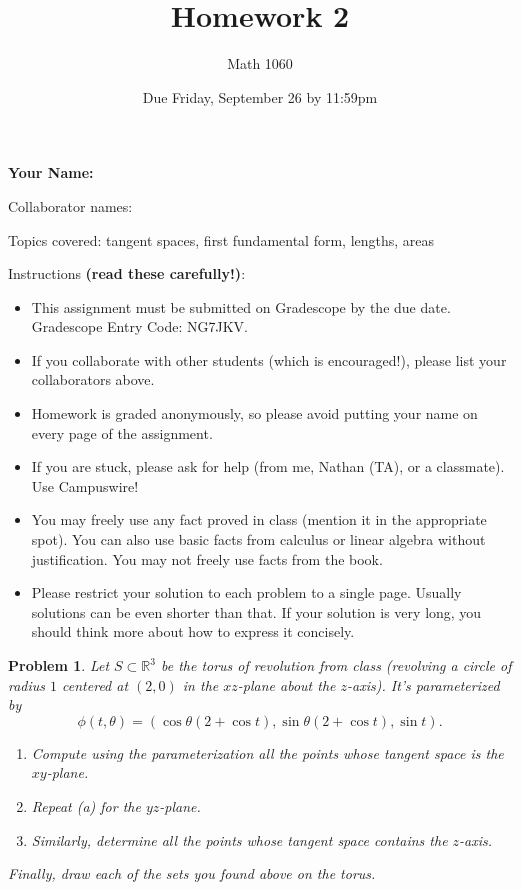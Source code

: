 \documentclass[11pt]{article}
\author{Math 1060}
\date{Due Friday, September 26 by 11:59pm}
\title{Homework 2}
\newtheorem{problem}{Problem}
\begin{document}
\maketitle


{\bf\Large Your Name:} 

Collaborator names: 


\vspace{.3in}
Topics covered: tangent spaces, first fundamental form, lengths, areas

Instructions {\bf (read these carefully!)}: 
\begin{itemize}
\item This assignment must be submitted on Gradescope by the due date. Gradescope Entry Code: NG7JKV. 
\item If you collaborate with other students (which is encouraged!), please list your collaborators above. 
\item Homework is graded anonymously, so please avoid putting your name on every page of the assignment.
\item If you are stuck, please ask for help (from me, Nathan (TA), or a classmate). Use Campuswire!  
\item You may freely use any fact proved in class (mention it in the appropriate spot). You can also use basic facts from calculus or linear algebra without justification. You may not freely use facts from the book. 
\item Please restrict your solution to each problem to a single page. Usually solutions can be even shorter than that. If your solution is very long, you should think more about how to express it concisely.
\end{itemize}
\pagebreak 



\begin{problem}
Let $S\subset\mathbb R^3$ be the torus of revolution from class (revolving a circle of radius $1$ centered at $(2,0)$ in the $xz$-plane about the $z$-axis). It's parameterized by 
\[\phi(t,\theta)=(\cos\theta(2+\cos t),\sin\theta(2+\cos t), \sin t).\]
\begin{enumerate}
\item[(a)] Compute using the parameterization all the points whose tangent space is the $xy$-plane. 
\item[(b)] Repeat (a) for the $yz$-plane. 
\item[(c)] Similarly, determine all the points whose tangent space contains the $z$-axis. 
\end{enumerate}
Finally, draw each of the sets you found above on the torus. 
\end{problem}
\end{document}
